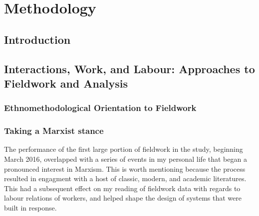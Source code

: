 \chapter{Methodology}
\label{sec:method}

\section{Introduction}
%
%
%
%


\section{Interactions, Work, and Labour: Approaches to Fieldwork and Analysis}
\label{sec:method:fieldwork}




\subsection{Ethnomethodological Orientation to Fieldwork}

\subsection{Taking a Marxist stance}

The performance of the first large portion of fieldwork in the study, beginning March 2016, overlapped with a series of events in my personal life that began a pronounced interest in Marxism. This is worth mentioning because the process resulted in engagment with a host of classic, modern, and academic literatures. This had a subsequent effect on my reading of fieldwork data with regards to labour relations of workers, and helped shape the design of systems that were built in response.


